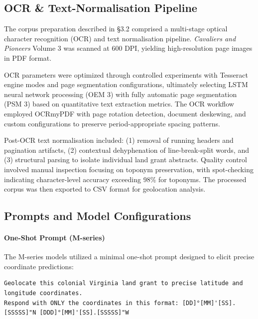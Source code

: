 \subsection{OCR \& Text-Normalisation
Pipeline}\label{a.1-ocr-text-normalisation-pipeline}

The corpus preparation described in §3.2 comprised a multi-stage optical
character recognition (OCR) and text normalisation pipeline.
\emph{Cavaliers and Pioneers} Volume 3 was scanned at 600 DPI, yielding
high-resolution page images in PDF format.

OCR parameters were optimized through controlled experiments with
Tesseract engine modes and page segmentation configurations, ultimately
selecting LSTM neural network processing (OEM 3) with fully automatic
page segmentation (PSM 3) based on quantitative text extraction metrics.
The OCR workflow employed OCRmyPDF with page rotation detection,
document deskewing, and custom configurations to preserve
period-appropriate spacing patterns.

Post-OCR text normalisation included: (1) removal of running headers and
pagination artifacts, (2) contextual dehyphenation of line-break-split
words, and (3) structural parsing to isolate individual land grant
abstracts. Quality control involved manual inspection focusing on
toponym preservation, with spot-checking indicating character-level
accuracy exceeding 98\% for toponyms. The processed corpus was then
exported to CSV format for geolocation analysis.

\subsection{Prompts and Model Configurations}\label{sec:prompts}

\paragraph{One-Shot Prompt
(M-series)}\label{a.2.1-one-shot-prompt-m-series}

The M-series models utilized a minimal one-shot prompt designed to
elicit precise coordinate predictions:

\begin{lstlisting}
Geolocate this colonial Virginia land grant to precise latitude and longitude coordinates.
Respond with ONLY the coordinates in this format: [DD]°[MM]'[SS].[SSSSS]"N [DDD]°[MM]'[SS].[SSSSS]"W
\end{lstlisting}


